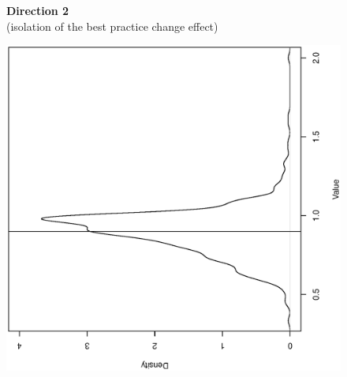 \documentclass[11pt,a4paper,oneside]{article}
\begin{document}
\begin{figure}[htbp]
\vspace{2mm}
  {{\bf Direction 2} \\{\footnotesize (isolation of the best practice change effect)} }\\
\hspace{-35mm}
  \begin{minipage}[c]{0.30\textwidth}
  \centering
  \begin{turn}{-90}
  \includegraphics[width=\textwidth,height=1.0\textwidth]{Direction.2/gml_BPC_DEA_2009-2013.ps}
  \end{turn}
  \hspace{35mm}
  \end{minipage}
  \begin{minipage}[c]{0.30\textwidth}
  \centering
  \begin{turn}{-90}

\end{turn}
\end{minipage}
\end{figure}
\end{document}
